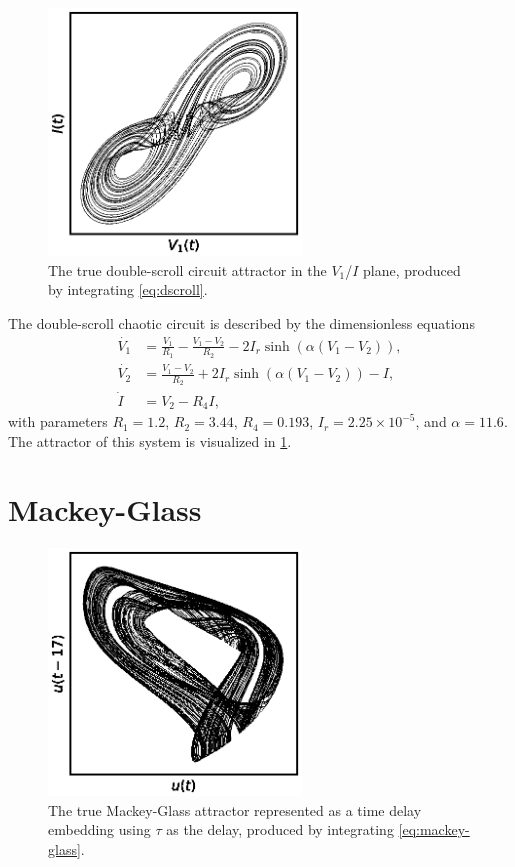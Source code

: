 \begin{figure}
  \includegraphics[width=0.6\textwidth]{figures/dscroll}
  \caption{The true double-scroll circuit attractor in the $V_1$/$I$ plane, produced by integrating \cref{eq:dscroll}.}%
  \label{fig:dscroll}
\end{figure}

The double-scroll chaotic circuit is described by the dimensionless equations
\begin{equation}
 \begin{aligned}
   \dot{V_1} &= \frac{V_1}{R_1} - \frac{V_1 - V_2}{R_2} - 2 I_r \sinh\left(\alpha(V_1 - V_2)\right), \\
   \dot{V_2} &= \frac{V_1 - V_2}{R_2} + 2 I_r \sinh\left(\alpha(V_1 - V_2)\right) - I, \\
   \dot{I} &= V_2 - R_4 I,
 \end{aligned}
 \label{eq:dscroll}
\end{equation}
with parameters $R_1 = 1.2$, $R_2 = 3.44$, $R_4 = 0.193$, $I_r = 2.25
\times 10^{-5}$, and $\alpha = 11.6$.\cite{gauthier1996} The attractor
of this system is visualized in \cref{fig:dscroll}.

\section{Mackey-Glass}\label{sec:mackey-glass}

\begin{figure}
  \includegraphics[width=0.6\textwidth]{figures/mackey-glass}
  \caption{The true Mackey-Glass attractor represented as a time delay embedding using $\tau$ as the delay, produced by integrating \cref{eq:mackey-glass}.}%
  \label{fig:mackey-glass}
\end{figure}

